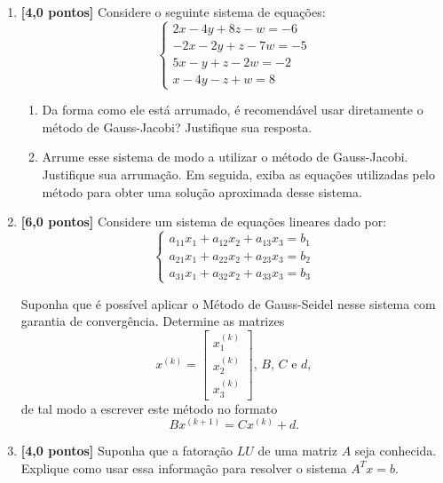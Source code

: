 \documentclass[12pt,a4paper]{article}
\begin{document}
\begin{enumerate}
 \item \textbf{[4,0 pontos]} Considere o seguinte sistema de equações:
  $$%
   \begin{cases}
    2x - 4y + 8z  - w = -6 \\
    -2x  - 2y + z - 7w = -5 \\
    5x  - y + z - 2w = -2 \\
    x - 4y - z + w = 8
   \end{cases}
  $$

  \begin{enumerate}
   \item Da forma como ele está arrumado, é recomendável usar diretamente o método de Gauss-Jacobi? Justifique sua resposta.
   \item Arrume esse sistema de modo a utilizar o método de Gauss-Jacobi. Justifique sua arrumação. Em seguida, exiba as equações 
         utilizadas pelo método para obter uma solução aproximada desse sistema.
  \end{enumerate}

 \item \textbf{[6,0 pontos]} Considere um sistema de equações lineares dado por:
$$\begin{cases}
   a_{11}x_1 + a_{12}x_2 + a_{13}x_3 = b_1 \\
   a_{21}x_1 + a_{22}x_2 + a_{23}x_3 = b_2 \\
   a_{31}x_1 + a_{32}x_2 + a_{33}x_3 = b_3
  \end{cases}
$$

Suponha que é possível aplicar o Método de Gauss-Seidel nesse sistema com garantia de convergência. Determine as matrizes 
$$x^{(k)} = \begin{bmatrix} x^{(k)}_1 \\ x^{(k)}_2 \\ x^{(k)}_3\end{bmatrix}, \,B,\, C \textrm{ e } d,$$ 
de tal modo a escrever este método no formato $$Bx^{(k+1)} = Cx^{(k)} + d.$$

 \item \textbf{[4,0 pontos]} Suponha que a fatoração $LU$ de uma matriz $A$ seja conhecida. Explique como usar essa informação para resolver o 
sistema $A^Tx = b$.

\end{enumerate}
\end{document}
